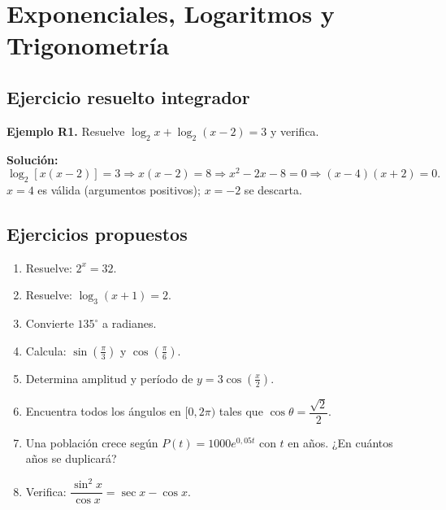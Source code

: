 \documentclass[12pt, letterpaper]{article}
\begin{document}
\section{Exponenciales, Logaritmos y Trigonometría}

\subsection{Ejercicio resuelto integrador}

\textbf{Ejemplo R1.} Resuelve $\log_2 x + \log_2(x - 2) = 3$ y verifica.

\begin{cuadrosolucion}
  \textbf{Solución:}
  $$\log_2[x(x - 2)] = 3 \Rightarrow x(x - 2) = 8 \Rightarrow x^2 - 2x - 8 = 0 \Rightarrow (x - 4)(x + 2) = 0.$$
  $x = 4$ es válida (argumentos positivos); $x = -2$ se descarta.
\end{cuadrosolucion}

\subsection{Ejercicios propuestos}

\begin{enumerate}[resume=ejercicios, leftmargin=*]
  \item \facil{} Resuelve: $2^x = 32$.

  \item \facil{} Resuelve: $\log_3(x + 1) = 2$.

  \item \facil{} Convierte $135^\circ$ a radianes.

  \item \facil{} Calcula: $\sin\left(\frac{\pi}{3}\right)$ y $\cos\left(\frac{\pi}{6}\right)$.

  \item \medio{} Determina amplitud y período de $y = 3\cos\left(\frac{x}{2}\right)$.

  \item \medio{} Encuentra todos los ángulos en $[0, 2\pi)$ tales que $\cos\theta = \dfrac{\sqrt{2}}{2}$.

  \item \dificil{} Una población crece según $P(t) = 1000e^{0{,}05t}$ con $t$ en años. ¿En cuántos años se duplicará?

  \item \dificil{} Verifica: $\dfrac{\sin^2 x}{\cos x} = \sec x - \cos x$.
\end{enumerate}
\end{document}
